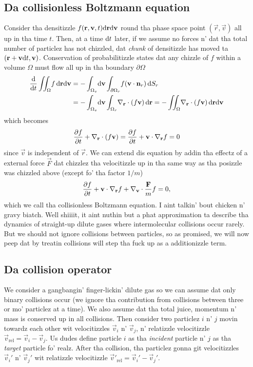 \subsection{Da collisionless Boltzmann equation}
Consider tha densitizzle $f(\mathbf r, \mathbf v, t)\mathrm{d}\mathbf r\mathrm{d}\mathbf v$ round tha phase space point $(\vec r,\vec v)$ all up in tha time $t$. Then, at a time $\mathrm{d}t$ later, if we assume no forces n' dat tha total number of particlez has not chizzled, dat \textit{chunk} of densitizzle has moved ta $(\mathbf r + \mathbf v\mathrm{d}t, \mathbf v)$. Conservation of probabilitizzle states dat any chizzle of $f$ within a volume $\Omega$ must flow all up in tha boundary $\partial \Omega$
\begin{align}
	\frac{\dm }{\dm t}\iint_\Omega\! f\, \dm \vec r \dm \vec v &= -\int_{\Omega_v}\!\dm \vec v\int_{\partial \Omega_r}\! f(\vec v\cdot \vec n_r)\, \dm S_r\\
	&= -\int_{\Omega_v}\!\dm \vec v\int_{\Omega_r}\! \nabla_\vec r\cdot(f\vec v)\, \dm \vec r = -\iint_{\Omega}\! \nabla_\vec r\cdot(f\vec v)\, \dm \vec r\dm \vec v
\end{align}
which becomes
\begin{align}
	\frac{\partial f}{\partial t} + \nabla_\mathbf r \cdot(f\mathbf v) = \frac{\partial f}{\partial t} + \mathbf v\cdot\nabla_\mathbf r f = 0
\end{align}
since $\vec v$ is independent of $\vec r$. We can extend dis equation by addin tha effectz of a external force $\vec F$ dat chizzlez tha velocitizzle up in tha same way as tha posizzle was chizzled above (except fo' tha factor $1/m$)
\begin{align}
	\label{eq:collisionless_boltzmann}
	\frac{\partial f}{\partial t} + \mathbf v\cdot\nabla_\mathbf r f + \nabla_\mathbf v \cdot \frac{\mathbf F}{ m}f = 0,
\end{align}
which we call tha collisionless Boltzmann equation. I aint talkin' bout chicken n' gravy biatch. Well shiiiit, it aint nuthin but a phat approximation ta describe tha dynamics of straight-up dilute gases where intermolecular collisions occur rarely. But we should not ignore collisions between particles, so as promised, we will now peep dat by treatin collisions will step tha fuck up as a additionizzle term.
\subsection{Da collision operator}
\label{sec:boltzmann_collision_operator}
We consider a gangbangin' finger-lickin' dilute gas so we can assume dat only binary collisions occur (we ignore tha contribution from collisions between three or mo' particlez at a time). We also assume dat tha total juice, momentum n' mass is conserved up in all collisions. Then consider two particlez $i$ n' $j$ movin towardz each other wit velocitizzles $\vec v_i$ n' $\vec v_j$, n' relatizzle velocitizzle $\vec v_\text{rel} = \vec v_i - \vec v_j$. Us dudes define particle $i$ as tha \textit{incident} particle n' $j$ as tha \textit{target} particle fo' realz. After tha collision, tha particlez gonna git velocitizzles $\vec v_i'$ n' $\vec v_j'$ wit relatizzle velocitizzle $\vec v'_\text{rel} = \vec v_i' - \vec v_j'$.

